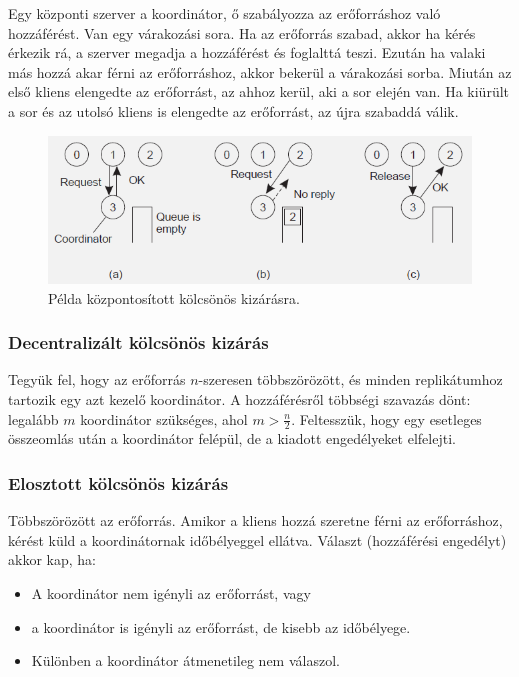 \documentclass[12pt]{article}
\begin{document}
	Egy központi szerver a koordinátor, ő szabályozza az erőforráshoz való hozzáférést. Van egy várakozási sora.
	Ha az erőforrás szabad, akkor ha kérés érkezik rá, a szerver megadja a hozzáférést és foglalttá teszi. Ezután
	ha valaki más hozzá akar férni az erőforráshoz, akkor bekerül a várakozási sorba. Miután az első kliens
	elengedte az erőforrást, az ahhoz kerül, aki a sor elején van. Ha kiürült a sor és az utolsó kliens is
	elengedte az erőforrást, az újra szabaddá válik.
	
	\begin{figure}[H]
		\centering
		\includegraphics[width=0.6\linewidth]{img/kolcskizar_kozp}
		\caption{Példa központosított kölcsönös kizárásra.}
		\label{fig:kolcskizar_kozp}
	\end{figure}
	
	\subsubsection{Decentralizált kölcsönös kizárás}
	
	Tegyük fel, hogy az erőforrás $n$-szeresen többszörözött, és minden replikátumhoz tartozik egy azt kezelő
	koordinátor. A hozzáférésről többségi szavazás dönt: legalább $m$ koordinátor szükséges, ahol $m>\frac{n}{2}$.
	Feltesszük, hogy egy esetleges összeomlás után a koordinátor felépül, de a kiadott engedélyeket
	elfelejti.
	
	\subsubsection{Elosztott kölcsönös kizárás}
	
	Többszörözött az erőforrás. Amikor a kliens hozzá szeretne férni az erőforráshoz, kérést küld a koordinátornak
	időbélyeggel ellátva. Választ (hozzáférési engedélyt) akkor kap, ha:
	
	\begin{itemize}
		\item	A koordinátor nem igényli az erőforrást, vagy
		\item	a koordinátor is igényli az erőforrást, de kisebb az időbélyege.
		\item	Különben a koordinátor átmenetileg nem válaszol.
	\end{itemize}
	
\end{document}
